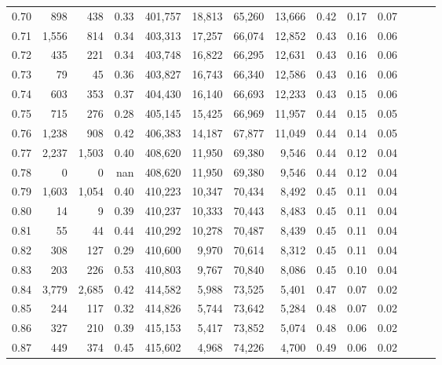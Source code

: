 \begin{tabular}{rrrrrrrrrrrrrr}
0.70 &     898 &    438 &  0.33 &  401,757 &   18,813 &  65,260 &  13,666 &  0.42 &  0.17 &      0.07 \\
0.71 &   1,556 &    814 &  0.34 &  403,313 &   17,257 &  66,074 &  12,852 &  0.43 &  0.16 &      0.06 \\
0.72 &     435 &    221 &  0.34 &  403,748 &   16,822 &  66,295 &  12,631 &  0.43 &  0.16 &      0.06 \\
0.73 &      79 &     45 &  0.36 &  403,827 &   16,743 &  66,340 &  12,586 &  0.43 &  0.16 &      0.06 \\
0.74 &     603 &    353 &  0.37 &  404,430 &   16,140 &  66,693 &  12,233 &  0.43 &  0.15 &      0.06 \\
0.75 &     715 &    276 &  0.28 &  405,145 &   15,425 &  66,969 &  11,957 &  0.44 &  0.15 &      0.05 \\
0.76 &   1,238 &    908 &  0.42 &  406,383 &   14,187 &  67,877 &  11,049 &  0.44 &  0.14 &      0.05 \\
0.77 &   2,237 &  1,503 &  0.40 &  408,620 &   11,950 &  69,380 &   9,546 &  0.44 &  0.12 &      0.04 \\
0.78 &       0 &      0 &   nan &  408,620 &   11,950 &  69,380 &   9,546 &  0.44 &  0.12 &      0.04 \\
0.79 &   1,603 &  1,054 &  0.40 &  410,223 &   10,347 &  70,434 &   8,492 &  0.45 &  0.11 &      0.04 \\
0.80 &      14 &      9 &  0.39 &  410,237 &   10,333 &  70,443 &   8,483 &  0.45 &  0.11 &      0.04 \\
0.81 &      55 &     44 &  0.44 &  410,292 &   10,278 &  70,487 &   8,439 &  0.45 &  0.11 &      0.04 \\
0.82 &     308 &    127 &  0.29 &  410,600 &    9,970 &  70,614 &   8,312 &  0.45 &  0.11 &      0.04 \\
0.83 &     203 &    226 &  0.53 &  410,803 &    9,767 &  70,840 &   8,086 &  0.45 &  0.10 &      0.04 \\
0.84 &   3,779 &  2,685 &  0.42 &  414,582 &    5,988 &  73,525 &   5,401 &  0.47 &  0.07 &      0.02 \\
0.85 &     244 &    117 &  0.32 &  414,826 &    5,744 &  73,642 &   5,284 &  0.48 &  0.07 &      0.02 \\
0.86 &     327 &    210 &  0.39 &  415,153 &    5,417 &  73,852 &   5,074 &  0.48 &  0.06 &      0.02 \\
0.87 &     449 &    374 &  0.45 &  415,602 &    4,968 &  74,226 &   4,700 &  0.49 &  0.06 &      0.02 \\

\end{tabular}
